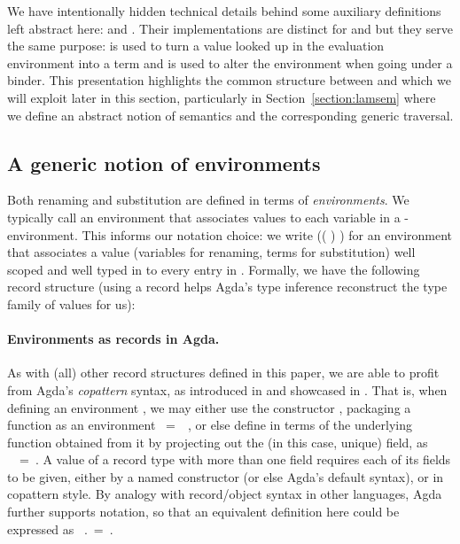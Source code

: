 We have intentionally hidden technical details behind some auxiliary definitions
left abstract here:  and . Their implementations are distinct
for  and  but they serve the same purpose:  is used to
turn a value looked up in the evaluation environment into a term and 
is used to alter the environment when going under a binder. This presentation
highlights the common structure between  and  which we will exploit
later in this section, particularly in Section~\ref{section:lamsem}
where we define an abstract notion of semantics and the corresponding generic traversal.

\subsection{A generic notion of environments}\label{sec:genenvironment}

Both renaming and substitution are defined in terms of \emph{environments}.
We typically call an environment that associates values
to each variable in  a -environment. This informs our notation choice: we write
{(( )  )} for an environment that associates
a value  (variables for renaming, terms for substitution) well scoped
and well typed in  to every entry in . Formally, we have the following
record structure (using a record helps Agda's type inference reconstruct the
type family  of values for us):

\begin{agdasnippet}
\end{agdasnippet}

\paragraph*{Environments as records in Agda.}
As with (all) other record structures defined in this paper, we are
able to profit from Agda's \emph{copattern} syntax, as introduced in
\cite{abel2013copatterns} and showcased in \cite{thibodeau2016case}.
That is, when defining an environment \AB{\(\rho\)}, we may either use
the constructor , packaging a function  as an
environment {\AB{\(\rho\)}~=~~}, or else define
\AB{\(\rho\)} in terms of the underlying function obtained from it by
projecting out the (in this case, unique)  field, as
{~\AB{\(\rho\)}~=~}. A value of a record type with
more than one field requires each of its fields to be given, either by
a named constructor (or else Agda's default  syntax), or in
copattern style. By analogy with record/object syntax in other
languages, Agda further supports  notation, so that an equivalent
definition here could be expressed as
{\AB{\(\rho\)}~.~=~}.

